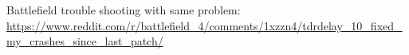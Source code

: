 Battlefield trouble shooting with same problem:
\url{https://www.reddit.com/r/battlefield_4/comments/1xzzn4/tdrdelay_10_fixed_my_crashes_since_last_patch/}

%
% 
 
 

